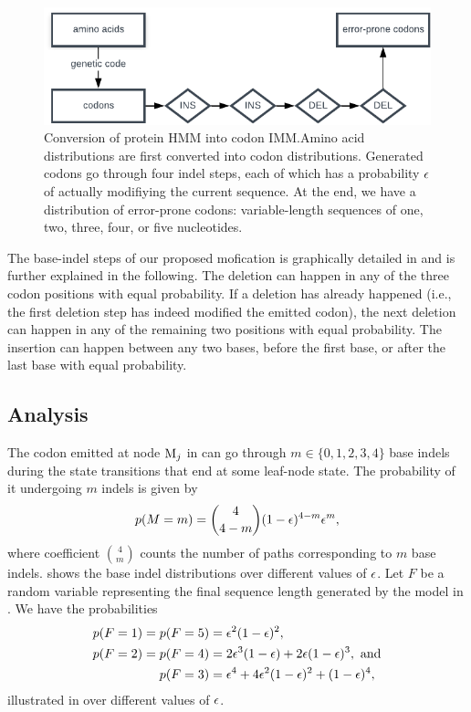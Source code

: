 \begin{figure}[htbp]
  \centering
  \captionsetup{width=.6\linewidth}
  \includegraphics[width=.6\linewidth]{figure/hmm-to-imm}
  \caption{Conversion of protein HMM into codon IMM.\@ Amino acid distributions are first converted
  into codon distributions. Generated codons go through four indel steps, each of which has a
  probability $\epsilon$ of actually modifiying the current sequence. At the end, we have a distribution
  of error-prone codons: variable-length sequences of one, two, three, four, or five
  nucleotides.}\label{fig:hmm-to-imm}
\end{figure}

The base-indel steps of our proposed mofication is graphically detailed in 
and is further explained in the following. The deletion can happen in any of the three codon
positions with equal probability. If a deletion has already happened (i.e., the first deletion step
has indeed modified the emitted codon), the next deletion can happen in any of the remaining two
positions with equal probability. The insertion can happen between any two bases, before the first
base, or after the last base with equal probability.

\subsection{Analysis}

The codon emitted at node $\mathrm{M}_j$ in  can go through $m\in\{0, 1, 2, 3,
4\}$ base indels during the state transitions that end at some leaf-node state. The probability of
it undergoing $m$ indels is given by
\begin{equation*}
  p(M=m) = \binom{4}{4-m} (1 - \epsilon)^{4-m} \epsilon^m,
\end{equation*}
where coefficient $\binom{4}{m}$ counts the number of paths corresponding to $m$ base indels.
 shows the base indel distributions over different values of $\epsilon$.
Let $F$ be a random variable representing the final sequence length generated by the model in
.
We have the probabilities
\begin{equation*}
  \begin{split}
    p(F=1) = p(F=5) &= \epsilon^2(1-\epsilon)^2, \\
    p(F=2) = p(F=4) &= 2\epsilon^3(1-\epsilon) + 2\epsilon(1-\epsilon)^3,~\text{and} \\
    p(F=3)          &= \epsilon^4 + 4\epsilon^2(1-\epsilon)^2 + (1-\epsilon)^4,
  \end{split}
\end{equation*}
illustrated in  over different values of $\epsilon$.


